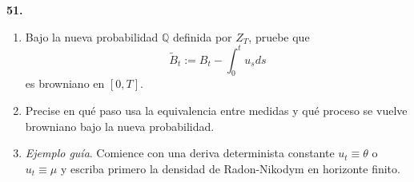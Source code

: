\documentclass[11pt, letterpaper]{article}
\begin{document}
\begin{ejercicio}
    \textbf{51.} 
    \begin{enumerate}
        \item[(a)] Bajo la nueva probabilidad $\mathbb{Q}$ definida por $Z_T$, pruebe que
        \[ \tilde{B}_t := B_t - \int_0^t u_s ds \]
        es browniano en $[0,T]$.
        \item[(b)] Precise en qué paso usa la equivalencia entre medidas y qué proceso se vuelve browniano bajo la nueva probabilidad.
        \item[(c)] \textit{Ejemplo guía}. Comience con una deriva determinista constante $u_t \equiv \theta$ o $u_t \equiv \mu$ y escriba primero la densidad de Radon-Nikodym en horizonte finito.
    \end{enumerate}
\end{ejercicio}

\vspace{5mm}
\end{document}
